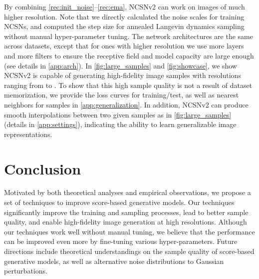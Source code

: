 \documentclass{article}
\begin{document}
By combining \cref{rec:init_noise}--\ref{rec:ema}, NCSNv2 can work on images of much higher resolution. Note that we directly calculated the noise scales for training NCSNs, and computed the step size for annealed Langevin dynamics sampling without manual hyper-parameter tuning. The network architectures are the same across datasets, except that for ones with higher resolution we use more layers and more filters to ensure the receptive field and model capacity are large enough (see details in \cref{app:arch}). In \cref{fig:large_samples} and \ref{fig:showcase}, we show NCSNv2 is capable of generating high-fidelity image samples with resolutions ranging from  to . To show that this high sample quality is not a result of dataset memorization, we provide the loss curves for training/test, as well as nearest neighbors for samples in \cref{app:generalization}. In addition, NCSNv2 can produce smooth interpolations between two given samples as in \cref{fig:large_samples} (details in \cref{app:settings}), indicating the ability to learn generalizable image representations.
 \section{Conclusion}
Motivated by both theoretical analyses and empirical observations, we propose a set of techniques to improve score-based generative models. Our techniques significantly improve the training and sampling processes,
lead to better sample quality, and enable high-fidelity image generation at high resolutions. Although our techniques work well without manual tuning, we believe that the performance can be improved even more by fine-tuning various hyper-parameters. Future directions include theoretical understandings on the sample quality of score-based generative models, as well as alternative noise distributions to Gaussian perturbations.
\end{document}
